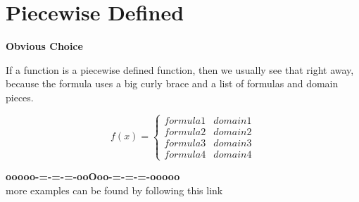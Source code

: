 \documentclass{ximera}
\begin{document}
\section*{Piecewise Defined}


\textbf{\textcolor{purple!85!blue}{Obvious Choice}} 

If a function is a piecewise defined function, then we usually see that right away, because the formula uses a big curly brace and a list of formulas and domain pieces.




\[
f(x) = 
\begin{cases}
  formula 1 & domain 1  \\
  formula 2 & domain 2  \\
  formula 3 & domain 3  \\
  formula 4 & domain 4  
\end{cases}
\]









\begin{onlineOnly}
\begin{center}
\textbf{\textcolor{green!50!black}{ooooo-=-=-=-ooOoo-=-=-=-ooooo}} \\

more examples can be found by following this link\\ 

\end{center}
\end{onlineOnly}
\end{document}
